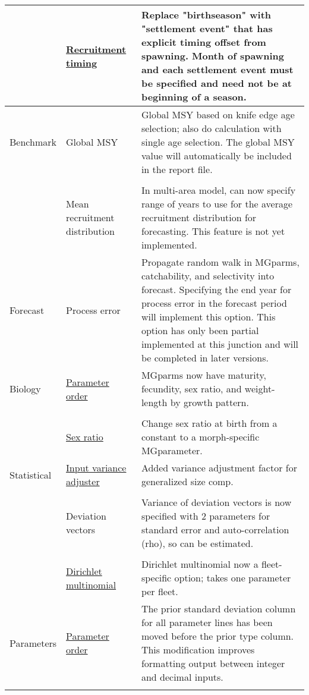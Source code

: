 \documentclass[12pt]{article}
\begin{document}
\begin{center}
\begin{longtable}{p{2cm} p{3cm} p{10cm}}
	\\
	& \hyperlink{RecrTiming}{Recruitment timing} & 
	Replace "birthseason" with "settlement event" that has explicit timing offset from spawning.  Month of spawning and each settlement event must be specified and need not be at beginning of a season.\\
	\hline
	Benchmark 
	& Global MSY &  
	Global MSY based on knife edge age selection; also do calculation with single age selection. The global MSY value will automatically be included in the report file.\\
	\\					
	& Mean recruitment distribution & 
	In multi-area model, can now specify range of years to use for the average recruitment distribution for forecasting. This feature is not yet implemented. \\
	\hline
	Forecast & 
	Process error & 
	Propagate random walk in MGparms, catchability, and selectivity into forecast. Specifying the end year for process error in the forecast period will implement this option.  This option has only been partial implemented at this junction and will be completed in later versions.\\
	\hline
	Biology 
	& \hyperlink{MGorder}{Parameter order} & 
	MGparms now have maturity, fecundity, sex ratio, and weight-length by growth pattern.\\
	\\						
	& \hyperlink{SexRatio}{Sex ratio} & 
	Change sex ratio at birth from a constant to a morph-specific MGparameter. \\
	\hline
	Statistical 
	& \hyperlink{GcompVar}{Input variance adjuster} & 
	Added variance adjustment factor for generalized size comp. \\
	\\						
	& Deviation vectors & 
	Variance of deviation vectors is now specified with 2 parameters for standard error and auto-correlation (rho), so can be estimated.\\
	\\						
	& \hyperlink{Dirichlet}{Dirichlet multinomial} & 
	Dirichlet multinomial now a fleet-specific option; takes one parameter per fleet. \\
	\hline
	Parameters 
	& \hyperlink{paraOrder}{Parameter order} & The prior standard deviation column for all parameter lines has been moved before the prior type column.  This modification improves formatting output between integer and decimal inputs.\\ 
	\\

\end{longtable}
\end{center}
\end{document}
